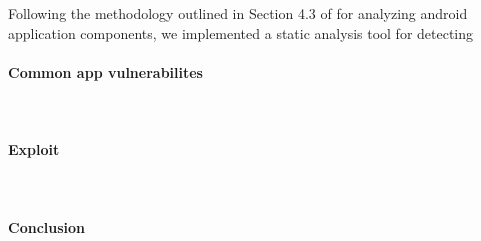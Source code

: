 \documentclass[12pt,a4paper]{article} \usepackage{verbatim}
\begin{document}
Following the methodology outlined in Section 4.3 of \cite{chin_analyzing_2011}
for analyzing android application components, we implemented a static
analysis tool for detecting

\paragraph{Common app vulnerabilites} ~\\

\paragraph{Exploit} ~\\

\paragraph{Conclusion} ~\\

 
\end{document}
